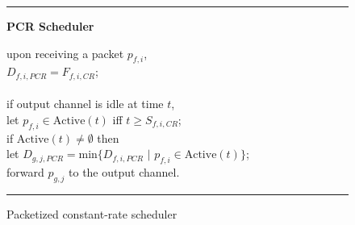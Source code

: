 \begin{figure}
\noindent
\rule{\columnwidth}{0.5mm}
\centerline{\bf PCR Scheduler}
\begin{tabbing}
\settabs
upon receiving a packet $p_{f,i}$,\\
\tea $D_{f,i,PCR} = F_{f,i,CR}$;\\
\\
if output channel is idle at time $t$,\\
\tea let $p_{f,i} \in \mbox{Active}(t)$ iff $t \geq S_{f,i,CR}$;\\
\tea if $\mbox{Active}(t) \neq \emptyset$ then\\
\teb let $D_{g,j,PCR} = \mbox{min}\{D_{f,i,PCR}\,\,|\,\, p_{f,i} \in 
\mbox{Active}(t)\}$;\\
\teb forward $p_{g,j}$ to the output channel.  \end{tabbing}
\caption{Packetized constant-rate scheduler}
\label{fig:PCR}
\rule{\columnwidth}{0.5mm}
\end{figure}

